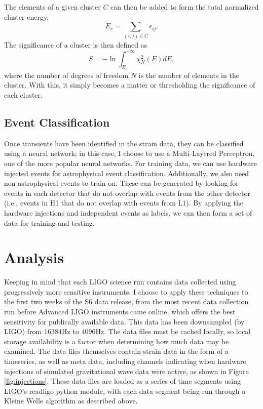 \documentclass{article}
\begin{document}
The elements of a given cluster $C$ can then be added to form the total normalized cluster energy\citep{Blackburn2007},
\begin{equation}
E_{c} = \sum_{(i,j)\in C}\epsilon_{ij}. \label{eq:Ec}
\end{equation}
The significance of a cluster is then defined as\citep{Blackburn2007}
\begin{equation}
S=-\ln\int_{E_{c}}^{+\infty}\chi_{N}^{2}(E)dE, \label{eq:significance}
\end{equation}
where the number of degrees of freedom $N$ is the number of elements in the cluster. With this, it simply becomes a matter or thresholding the significance of each cluster.

\subsection{Event Classification}
Once transients have been identified in the strain data, they can be classified using a neural network; in this case, I choose to use a Multi-Layered Perceptron, one of the more popular neural networks. For training data, we can use hardware injected events for astrophysical event classification. Additionally, we also need non-astrophysical events to train on. These can be generated by looking for events in each detector that do not overlap with events from the other detector (i.e., events in H1 that do not overlap with events from L1). By applying the hardware injections and independent events as labels, we can then form a set of data for training and testing.

\section{Analysis}
Keeping in mind that each LIGO science run contains data collected using progressively more sensitive instruments, I choose to apply these techniques to the first two weeks of the S6 data release\citep{LIGOScientificCollaboration2015}, from the most recent data collection run before Advanced LIGO instruments came online, which offers the best sensitivity for publically available data. This data has been downsampled (by LIGO) from $16384\mathrm{Hz}$ to $4096\mathrm{Hz}$\citep{LIGOScientificCollaboration2015}. The data files must be cached locally, so local storage availability is a factor when determining how much data may be examined. The data files themselves contain strain data in the form of a timeseries, as well as meta data, including channels indicating when hardware injections of simulated gravitational wave data were active, as shown in Figure \ref{fig:injections}. These data files are loaded as a series of time segments using LIGO's readligo python module\citep{Kanner2017}, with each data segment being run through a Kleine Welle algorithm as described above.
\end{document}
